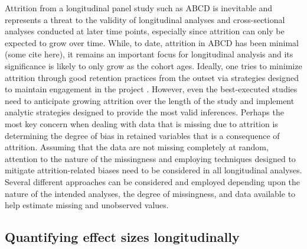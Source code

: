 \documentclass[
  10pt,
  letterpaper,
]{article}
\begin{document}
Attrition from a longitudinal panel study such as ABCD is inevitable and
represents a threat to the validity of longitudinal analyses and
cross-sectional analyses conducted at later time points, especially
since attrition can only be expected to grow over time. While, to date,
attrition in ABCD has been minimal (some cite here), it remains an
important focus for longitudinal analysis and its significance is likely
to only grow as the cohort ages. Ideally, one tries to minimize
attrition through good retention practices from the outset via
strategies designed to maintain engagement in the project
\citep{cotter2005, hill2016, watson2018}. However, even the
best-executed studies need to anticipate growing attrition over the
length of the study and implement analytic strategies designed to
provide the most valid inferences. Perhaps the most key concern when
dealing with data that is missing due to attrition is determining the
degree of bias in retained variables that is a consequence of attrition.
Assuming that the data are not missing completely at random, attention
to the nature of the missingness and employing techniques designed to
mitigate attrition-related biases need to be considered in all
longitudinal analyses. Several different approaches can be considered
and employed depending upon the nature of the intended analyses, the
degree of missingness, and data available to help estimate missing and
unobserved values.

\hypertarget{quantifying-effect-sizes-longitudinally}{%
\subsection{Quantifying effect sizes
longitudinally}\label{quantifying-effect-sizes-longitudinally}}
\end{document}
